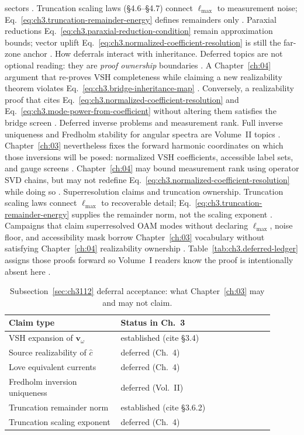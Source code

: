sectors \cite{jackson1999}. Truncation scaling laws (§4.6--§4.7) connect \(\ell_{\max}\) to measurement noise; Eq.~\eqref{eq:ch3.truncation-remainder-energy}
defines remainders only \cite{kato1995}. Paraxial reductions Eq.~\eqref{eq:ch3.paraxial-reduction-condition} remain approximation bounds;
vector uplift Eq.~\eqref{eq:ch3.normalized-coefficient-resolution} is still the far-zone anchor \cite{allen1992}.
How deferrals interact with inheritance. Deferred topics are not optional reading: they are \emph{proof ownership} boundaries \cite{stratton1941}. A Chapter~\ref{ch:04} argument that
re-proves VSH completeness while claiming a new realizability theorem violates Eq.~\eqref{eq:ch3.bridge-inheritance-map}
\cite{harrington2001}. Conversely, a realizability proof that cites Eq.~\eqref{eq:ch3.normalized-coefficient-resolution} and
Eq.~\eqref{eq:ch3.mode-power-from-coefficient} without altering them satisfies the bridge screen \cite{poynting1884}.
Deferred inverse problems and measurement rank. Full inverse uniqueness and Fredholm stability for angular spectra are Volume~II topics \cite{devaney2004}. Chapter~\ref{ch:03} nevertheless fixes the forward harmonic coordinates on which those inversions will be posed: normalized VSH coefficients, accessible label sets, and gauge screens
\cite{hansen1988}. Chapter~\ref{ch:04} may bound measurement rank using operator SVD chains, but may not redefine Eq.~\eqref{eq:ch3.normalized-coefficient-resolution} while doing so
\cite{harrington2001}.
Superresolution claims and truncation ownership. Truncation scaling laws connect \(\ell_{\max}\) to recoverable detail; Eq.~\eqref{eq:ch3.truncation-remainder-energy} supplies the remainder norm, not the scaling exponent
\cite{kato1995}. Campaigns that claim superresolved OAM modes without declaring \(\ell_{\max}\), noise floor, and accessibility mask borrow Chapter~\ref{ch:03} vocabulary without satisfying Chapter~\ref{ch:04} realizability ownership
\cite{allen1992}. Table~\ref{tab:ch3.deferred-ledger} assigns those proofs forward so Volume~I readers know the proof is intentionally absent here
\cite{stratton1941}.
\begin{table}[t]
\centering
\caption{Subsection~\ref{sec:ch3112} deferral acceptance: what Chapter~\ref{ch:03} may and may not claim.}
\label{tab:ch3.3112-deferral-acceptance}
\small
\begin{tabular}{@{}p{0.38\linewidth}p{0.52\linewidth}@{}}
\toprule
Claim type & Status in Ch.~3 \\
\midrule
VSH expansion of $\mathbf{v}_\omega$ & established (cite §3.4) \\
Source realizability of $\widehat{c}$ & deferred (Ch.~4) \\
Love equivalent currents & deferred (Ch.~4) \\
Fredholm inversion uniqueness & deferred (Vol.~II) \\
Truncation remainder norm & established (cite §3.6.2) \\
Truncation scaling exponent & deferred (Ch.~4) \\
\bottomrule
\end{tabular}
\end{table}
